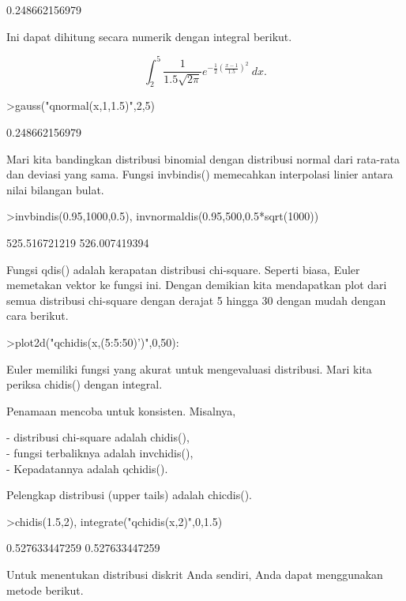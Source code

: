 \documentclass[a4paper,10pt]{article}
\begin{document}
\begin{eulernotebook}
\begin{euleroutput}
  0.248662156979
\end{euleroutput}
\begin{eulercomment}
Ini dapat dihitung secara numerik dengan integral berikut.\\
\end{eulercomment}
\begin{eulerformula}
\[
\int_2^5 \frac{1}{1.5\sqrt{2\pi}}e^{-\frac{1}{2}(\frac{x-1}{1.5})^2}\ dx.
\]
\end{eulerformula}
\begin{eulerprompt}
>gauss("qnormal(x,1,1.5)",2,5)
\end{eulerprompt}
\begin{euleroutput}
  0.248662156979
\end{euleroutput}
\begin{eulercomment}
Mari kita bandingkan distribusi binomial dengan distribusi normal dari
rata-rata dan deviasi yang sama. Fungsi invbindis() memecahkan
interpolasi linier antara nilai bilangan bulat.
\end{eulercomment}
\begin{eulerprompt}
>invbindis(0.95,1000,0.5), invnormaldis(0.95,500,0.5*sqrt(1000))
\end{eulerprompt}
\begin{euleroutput}
  525.516721219
  526.007419394
\end{euleroutput}
\begin{eulercomment}
Fungsi qdis() adalah kerapatan distribusi chi-square. Seperti biasa,
Euler memetakan vektor ke fungsi ini. Dengan demikian kita mendapatkan
plot dari semua distribusi chi-square dengan derajat 5 hingga 30
dengan mudah dengan cara berikut.
\end{eulercomment}
\begin{eulerprompt}
>plot2d("qchidis(x,(5:5:50)')",0,50):
\end{eulerprompt}
\begin{eulercomment}
Euler memiliki fungsi yang akurat untuk mengevaluasi distribusi. Mari
kita periksa chidis() dengan integral.

Penamaan mencoba untuk konsisten. Misalnya,

- distribusi chi-square adalah chidis(),\\
- fungsi terbaliknya adalah invchidis(),\\
- Kepadatannya adalah qchidis().

Pelengkap distribusi (upper tails) adalah chicdis().
\end{eulercomment}
\begin{eulerprompt}
>chidis(1.5,2), integrate("qchidis(x,2)",0,1.5)
\end{eulerprompt}
\begin{euleroutput}
  0.527633447259
  0.527633447259
\end{euleroutput}
\begin{eulercomment}
Untuk menentukan distribusi diskrit Anda sendiri, Anda dapat
menggunakan metode berikut.


\end{eulercomment}
\end{eulernotebook}
\end{document}
